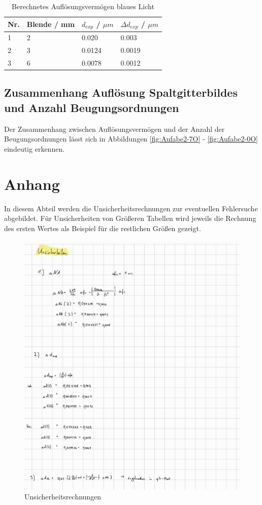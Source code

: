\documentclass[12pt,a4paper,twoside]{article}
\begin{document}
\begin{table}[H]
    \centering
    \caption{Berechnetes Auflösungsvermögen blaues Licht}
    \label{tab:BerechneteAVblau}
    \begin{tabular}{| l | l | l | l |}
        \hline
        Nr. & Blende / mm & $d_{exp}$ / $\mu m$ & $\Delta d_{exp}$ / $\mu m$ \\
        \hline
        1 & 2 & 0.020  & 0.003  \\
        2 & 3 & 0.0124 & 0.0019 \\
        3 & 6 & 0.0078 & 0.0012 \\
        \hline
    \end{tabular}
\end{table}


\subsection{Zusammenhang Auflösung Spaltgitterbildes und Anzahl Beugungsordnungen}

Der Zusammenhang zwischen Auflösungsvermögen und der Anzahl der Beugungsordnungen lässt sich in Abbildungen \ref{fig:Aufabe2-7O} - \ref{fig:Aufabe2-0O} eindeutig erkennen.



\newpage
\section{Anhang}

In diesem Abteil werden die Unsicherheitsrechnungen zur eventuellen Fehlersuche abgebildet. Für Unsicherheiten von Größeren Tabellen wird jeweils die Rechnung des ersten Wertes als Beispiel für die restlichen Größen gezeigt.

\begin{figure}[H]
    \centering
    \includegraphics[width=0.8\linewidth, angle=0]{nudes/Unsicherheiten1.jpg}
    \caption{Unsicherheitsrechnungen}
    \label{fig:Unsicherheitsrechnungen1}
\end{figure}

\printbibliography[heading=bibintoc]
\end{document}
